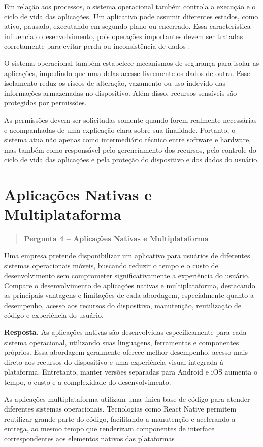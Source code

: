 \documentclass[
    12pt,
    oneside,
    a4paper,
    brazil
]{abntex2}
\newcommand{\pergunta}[2]{%
\begin{quote}
\noindent\textbf{Pergunta #1 -- #2}
\end{quote}}
\newcommand{\resposta}{%
\par\noindent\textbf{Resposta.}\hspace{0.3em}
}
\begin{document}
Em relação aos processos, o sistema operacional também controla a execução e o ciclo de vida das aplicações. Um aplicativo pode assumir diferentes estados, como ativo, pausado, executando em segundo plano ou encerrado. Essa característica influencia o desenvolvimento, pois operações importantes devem ser tratadas corretamente para evitar perda ou inconsistência de dados \cite{androidLifecycle,appleLifecycle}. 

O sistema operacional também estabelece mecanismos de segurança para isolar as aplicações, impedindo que uma delas acesse livremente os dados de outra. Esse isolamento reduz os riscos de alteração, vazamento ou uso indevido das informações armazenadas no dispositivo. Além disso, recursos sensíveis são protegidos por permissões. 

As permissões devem ser solicitadas somente quando forem realmente necessárias e acompanhadas de uma explicação clara sobre sua finalidade. Portanto, o sistema atua não apenas como intermediário técnico entre software e hardware, mas também como responsável pelo gerenciamento dos recursos, pelo controle do ciclo de vida das aplicações e pela proteção do dispositivo e dos dados do usuário.

\section{Aplicações Nativas e Multiplataforma}
\pergunta{4}{Aplicações Nativas e Multiplataforma}

Uma empresa pretende disponibilizar um aplicativo para usuários de diferentes sistemas operacionais móveis, buscando reduzir o tempo e o custo de desenvolvimento sem comprometer significativamente a experiência do usuário. Compare o desenvolvimento de aplicações nativas e multiplataforma, destacando as principais vantagens e limitações de cada abordagem, especialmente quanto a desempenho, acesso aos recursos do dispositivo, manutenção, reutilização de código e experiência do usuário.

\resposta As aplicações nativas são desenvolvidas especificamente para cada sistema operacional, utilizando suas linguagens, ferramentas e componentes próprios. Essa abordagem geralmente oferece melhor desempenho, acesso mais direto aos recursos do dispositivo e uma experiência visual integrada à plataforma. Entretanto, manter versões separadas para Android e iOS aumenta o tempo, o custo e a complexidade do desenvolvimento. 

As aplicações multiplataforma utilizam uma única base de código para atender diferentes sistemas operacionais. Tecnologias como React Native permitem reutilizar grande parte do código, facilitando a manutenção e acelerando a entrega, ao mesmo tempo que renderizam componentes de interface correspondentes aos elementos nativos das plataformas \cite{reactNativeHome}. 
\end{document}
